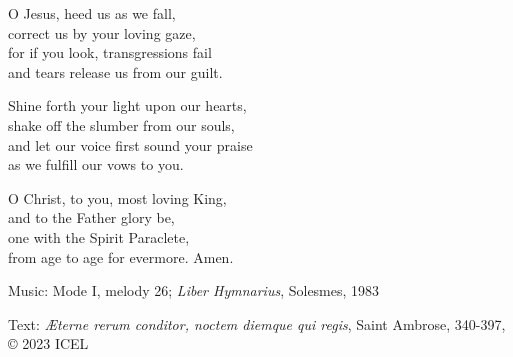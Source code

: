 \hymn



\begin{underhymnverse}




O Jesus, heed us as we fall,\\
correct us by your loving gaze,\\
for if you look, transgressions fail\\
and tears release us from our guilt.

Shine forth your light upon our hearts,\\
shake off the slumber from our souls,\\
and let our voice first sound your praise\\
as we fulfill our vows to you.

O Christ, to you, most loving King,\\
and to the Father glory be,\\
one with the Spirit Paraclete,\\
from age to age for evermore. Amen.
\end{underhymnverse}

\begin{hymnsource}
Music: Mode I, melody 26; \emph{Liber Hymnarius}, Solesmes, 1983

Text: \emph{Æterne rerum conditor, noctem diemque qui regis}, Saint Ambrose, 340-397, © 2023 ICEL
\end{hymnsource}
